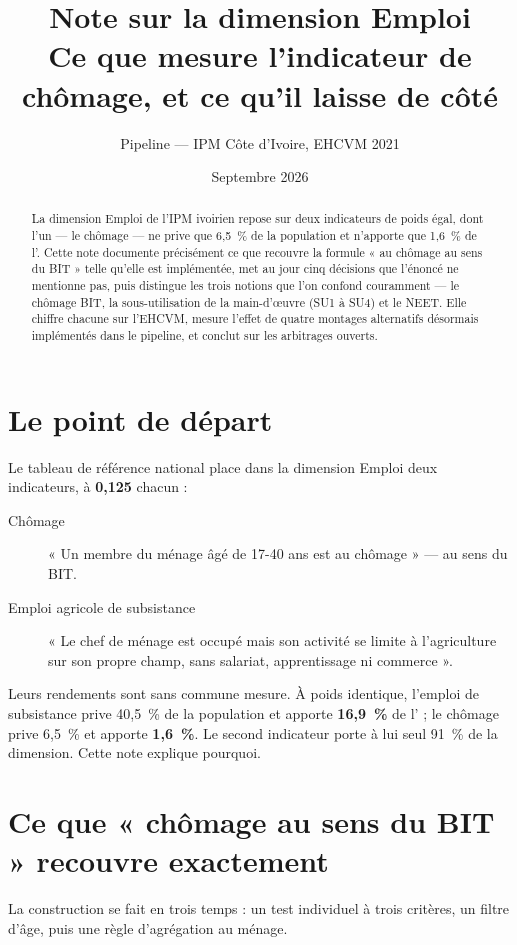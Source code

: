 \documentclass[11pt,a4paper]{article}
\title{\bfseries Note sur la dimension Emploi\\[4pt]
\large Ce que mesure l'indicateur de chômage, et ce qu'il laisse de côté}
\author{Pipeline \col{PythonIPM} --- IPM Côte d'Ivoire, EHCVM 2021}
\date{Septembre 2026}
\begin{document}
\maketitle

\begin{abstract}
\noindent La dimension Emploi de l'IPM ivoirien repose sur deux indicateurs de poids égal, dont
l'un --- le chômage --- ne prive que 6,5~\% de la population et n'apporte que 1,6~\% de l'\ipm{}.
Cette note documente précisément ce que recouvre la formule « au chômage au sens du BIT » telle
qu'elle est implémentée, met au jour cinq décisions que l'énoncé ne mentionne pas, puis distingue
les trois notions que l'on confond couramment --- le chômage BIT, la sous-utilisation de la
main-d'\oe uvre (SU1 à SU4) et le NEET. Elle chiffre chacune sur l'EHCVM, mesure l'effet
de quatre montages alternatifs désormais implémentés dans le pipeline, et conclut sur les
arbitrages ouverts.
\end{abstract}

\section{Le point de départ}

Le tableau de référence national place dans la dimension Emploi deux indicateurs, à
\textbf{0,125} chacun :

\begin{description}
  \item[Chômage] « Un membre du ménage âgé de 17-40 ans est au chômage » --- au sens du BIT.
  \item[Emploi agricole de subsistance] « Le chef de ménage est occupé mais son activité se
  limite à l'agriculture sur son propre champ, sans salariat, apprentissage ni commerce ».
\end{description}

Leurs rendements sont sans commune mesure. À poids identique, l'emploi de subsistance prive
40,5~\% de la population et apporte \textbf{16,9~\%} de l'\ipm{} ; le chômage prive 6,5~\% et
apporte \textbf{1,6~\%}. Le second indicateur porte à lui seul 91~\% de la dimension. Cette note
explique pourquoi.

\section{Ce que « chômage au sens du BIT » recouvre exactement}

La construction se fait en trois temps : un test individuel à trois critères, un filtre d'âge,
puis une règle d'agrégation au ménage.
\end{document}
